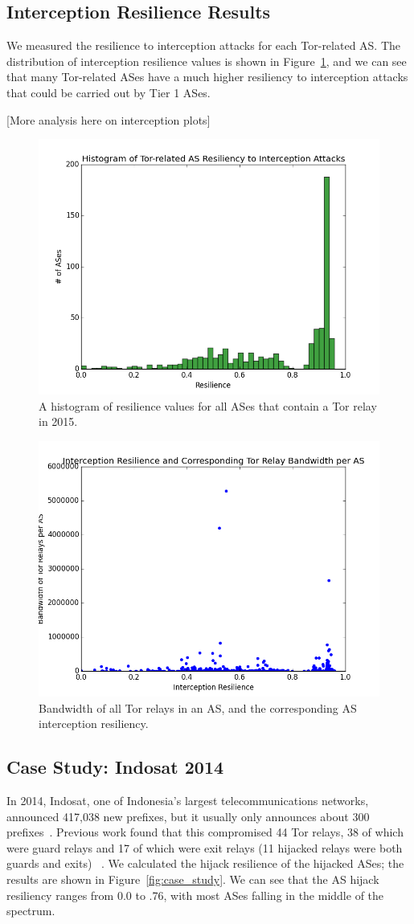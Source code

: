 \subsection{Interception Resilience Results}

We measured the resilience to interception attacks for each Tor-related AS.  The distribution of interception resilience values is shown in Figure~\ref{fig:interception_histogram}, and we can see that many Tor-related ASes have a much higher resiliency to interception attacks that could be carried out by Tier 1 ASes.  

[More analysis here on interception plots]

\begin{figure}
\centering
\includegraphics[width=.4\textwidth]{interception_resiliency}
\caption{A histogram of resilience values for all ASes that contain a Tor relay in 2015.}
\label{fig:interception_histogram}
\end{figure}

\begin{figure}
\centering
\includegraphics[width=.4\textwidth]{interception_bandwidth}
\caption{Bandwidth of all Tor relays in an AS, and the corresponding AS interception resiliency.}
\label{fig:interception_bw}
\end{figure}

\subsection{Case Study: Indosat 2014}
In 2014, Indosat, one of Indonesia's largest telecommunications networks, announced 417,038 new prefixes, but it usually only announces about 300 prefixes~\cite{indosat2014}.  Previous work found that this compromised 44 Tor relays, 38 of which were guard relays and 17 of which were exit relays (11 hijacked relays were both guards and exits) ~\cite{sun2015raptor}.  We calculated the hijack resilience of the hijacked ASes; the results are shown in Figure~\ref{fig:case_study}.  We can see that the AS hijack resiliency ranges from 0.0 to .76, with most ASes falling in the middle of the spectrum. 

